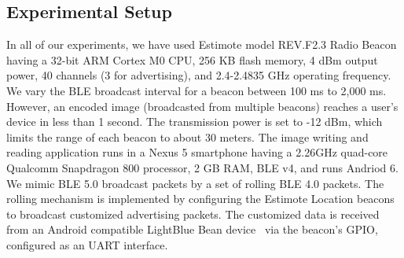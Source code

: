 
\subsection{Experimental Setup}

In all of our experiments, we have used Estimote model REV.F2.3 Radio Beacon~\cite{ESTIMOTE} having a 32-bit ARM Cortex M0 CPU, 256 KB flash memory, 4 dBm output power, 40 channels (3 for advertising), and 2.4-2.4835 GHz operating frequency. We vary the BLE broadcast interval for a beacon between 100 ms to 2,000 ms. However, an encoded image (broadcasted from multiple beacons) reaches a user's device in less than 1 second. The transmission power is set to -12 dBm, which limits the range of each beacon to about 30 meters. The image writing and reading application runs in a Nexus 5 smartphone having a 2.26GHz quad-core Qualcomm Snapdragon 800 processor, 2 GB RAM, BLE v4, and runs Andriod 6. We mimic BLE 5.0 broadcast packets by a set of rolling BLE 4.0 packets. The rolling mechanism is implemented by configuring the Estimote Location beacons to broadcast customized advertising packets. The customized data is received from an Android compatible LightBlue Bean device~\cite{LBB} via the beacon's GPIO, configured as an UART interface.






